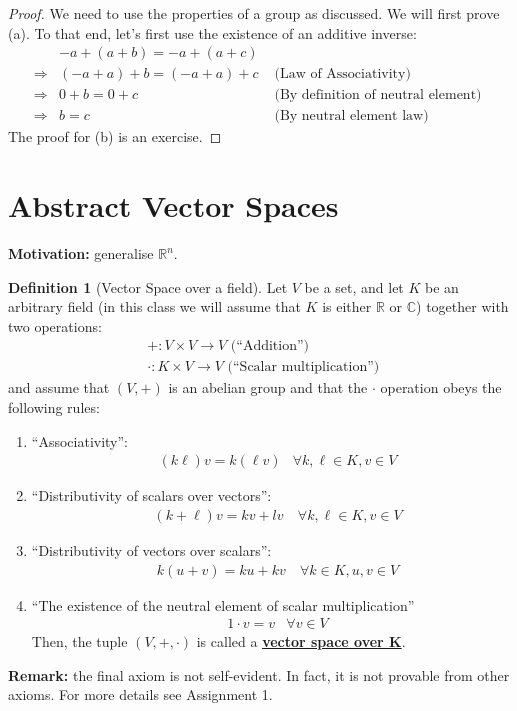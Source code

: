 \documentclass[11pt]{scrartcl}
\newcommand{\R}[0]{\mathbb{R}}
\theoremstyle{definition}
\newtheorem{definition}{Definition}
\theoremstyle{remark}
\newcommand{\dfn}[1]{\textbf{\underline{#1}}}
\newcommand{\C}[0]{\mathbb{C}}
\begin{document}
\begin{proof}
	We need to use the properties of a group as discussed. We will first prove (a). To that end, let's first use the existence of an additive inverse:
	\begin{align*} 
		& -a + (a+b ) = -a + (a+c) \\
	 \Rightarrow & (-a + a ) + b = (-a + a) + c & \text{ (Law of Associativity) } \\
	 \Rightarrow &  0 + b = 0 + c &  \text{ (By definition of neutral element) } \\
	 \Rightarrow & b = c &  \text{ (By neutral element law)} 
	\end{align*}
	The proof for (b) is an exercise. 
\end{proof}

\section{Abstract Vector Spaces}
\textbf{Motivation:} generalise $\R^n$. 

\begin{definition}[Vector Space over a field] Let $V$ be a set, and let $K$ be an arbitrary field (in this class we will assume that $K$ is either $\R$ or $\C$) together with two operations: 
\begin{align*}
	& +: V \times V \rightarrow V  \text{ (``Addition'') } \\
	& \cdot: K  \times V \rightarrow V 	 \text{ (``Scalar multiplication'') } 
\end{align*}
and assume that $(V, +)$ is an abelian group and that the $\cdot$ operation obeys the following rules: 
\begin{enumerate}[noitemsep]
	\item ``Associativity'': 
	\begin{align*}
		& (k \ell) v = k ( \ell v)  & \forall k, \ell \in K,  v \in V	
	\end{align*}
	\item ``Distributivity of scalars over vectors'': 
	\begin{align*}
		& ( k + \ell) v = k v + l v\ &  \forall k, \ell \in K, v \in V
	\end{align*}
	\item ``Distributivity of vectors over scalars'': 
	\begin{align*}
		& k (u + v ) = k u + kv\  & \forall k \in K, u, v \in V 	
	\end{align*}
	\item ``The existence of the neutral element of scalar multiplication'' 
	\begin{align*}
		& 1 \cdot v = v 	& \forall v \in V 
	\end{align*}
Then, the tuple $(V, +, \cdot)$ is called a \dfn{vector space over K}. 
\end{enumerate}

\textbf{Remark:} the final axiom is not self-evident. In fact, it is not provable from other axioms. For more details see Assignment 1. 
\end{definition}
\end{document}
